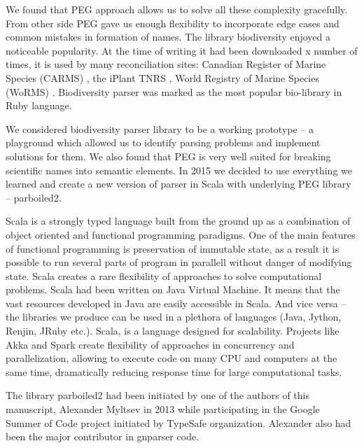 \documentclass{bmcart}
\begin{document}
We found that PEG approach allows us to solve all these complexity gracefully.
From other side PEG gave us enough flexibility to incorporate edge cases and
common mistakes in formation of names. The library biodiversity enjoyed a
noticeable popularity. At the time of writing it had been downloaded x number
of times, it is used by many reconciliation sites: Canadian Register of Marine
Species (CARMS) \cite{carms}, the iPlant TNRS \cite{iplant}, World Registry of
Marine Species (WoRMS) \cite{worms}.  Biodiversity parser was marked as the
most popular bio-library in Ruby language.

We considered biodiversity parser library to be a working prototype -- a
playground which allowed us to identify parsing problems and implement
solutions for them. We also found that PEG is very well suited for breaking
scientific names into semantic elements. In 2015 we decided to use everything
we learned and create a new version of parser in Scala with underlying PEG
library -- parboiled2.

Scala is a strongly typed language built from the ground up as a combination of
object oriented and functional programming paradigms. One of the main features
of functional programming is preservation of immutable state, as a result it is
possible to run several parts of program in parallell without danger of
modifying state. Scala creates a rare flexibility of approaches to solve
computational problems. Scala had been written on Java Virtual Machine. It
means that the vast resources developed in Java are easily accessible in Scala.
And vice versa -- the libraries we produce can be used in a plethora of
languages (Java, Jython, Renjin, JRuby etc.). Scala, is a language designed for
scalability. Projects like Akka and Spark create flexibility of approaches in
concurrency and parallelization, allowing to execute code on many CPU and
computers at the same time, dramatically reducing response time for large
computational tasks.

The library parboiled2 had been initiated by one of the authors of this
manuscript, Alexander Myltsev in 2013 while participating in the Google Summer
of Code project initiated by TypeSafe organization. Alexander also had been the
major contributor in gnparser code.



\end{document}
